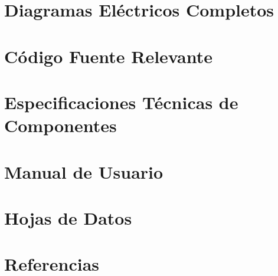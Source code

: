 \documentclass[a4paper,12pt]{report}
\begin{document}
\appendix
\chapter{Diagramas Eléctricos Completos}


\chapter{Código Fuente Relevante}


\chapter{Especificaciones Técnicas de Componentes}


\chapter{Manual de Usuario}


\chapter{Hojas de Datos}


\chapter*{Referencias}

\end{document}

